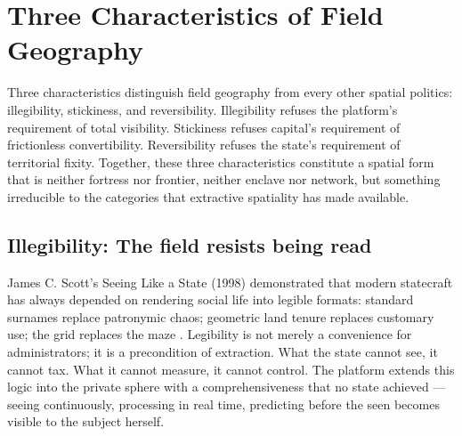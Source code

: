 \section{Three Characteristics of Field Geography}

Three characteristics distinguish field geography from every other spatial politics: illegibility, stickiness, and reversibility. Illegibility refuses the platform’s requirement of total visibility. Stickiness refuses capital’s requirement of frictionless convertibility. Reversibility refuses the state’s requirement of territorial fixity. Together, these three characteristics constitute a spatial form that is neither fortress nor frontier, neither enclave nor network, but something irreducible to the categories that extractive spatiality has made available.

\subsection{Illegibility: The field resists being read}

James C. Scott’s Seeing Like a State (1998) demonstrated that modern statecraft has always depended on rendering social life into legible formats: standard surnames replace patronymic chaos; geometric land tenure replaces customary use; the grid replaces the maze \cite[pp.~1--8]{scott_1998}. Legibility is not merely a convenience for administrators; it is a precondition of extraction. What the state cannot see, it cannot tax. What it cannot measure, it cannot control. The platform extends this logic into the private sphere with a comprehensiveness that no state achieved — seeing continuously, processing in real time, predicting before the seen becomes visible to the subject herself.

